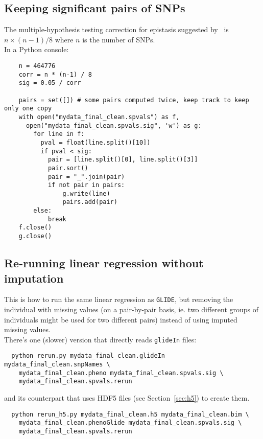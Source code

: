 \documentclass{article}
\newcommand{\glide}{\texttt{GLIDE}}
\begin{document}
\subsection{Keeping significant pairs of SNPs}
The multiple-hypothesis testing correction for epistasis suggested by~\cite{becker11} is $n \times (n-1)/8$ where $n$ is the number of SNPs. \\

In a Python console:\\
\begin{verbatim}
    n = 464776
    corr = n * (n-1) / 8 
    sig = 0.05 / corr

    pairs = set([]) # some pairs computed twice, keep track to keep only one copy
    with open("mydata_final_clean.spvals") as f, 
      open("mydata_final_clean.spvals.sig", 'w') as g:
        for line in f: 
          pval = float(line.split()[10]) 
          if pval < sig:
            pair = [line.split()[0], line.split()[3]]
            pair.sort()
            pair = "_".join(pair)
            if not pair in pairs:
                g.write(line)
                pairs.add(pair)
        else:
            break
    f.close()
    g.close()
\end{verbatim}


\subsection{Re-running linear regression without imputation}
\label{sec:rerun}
This is how to run the same linear regression as \glide, but removing the individual with missing values (on a pair-by-pair basis, ie. two different groups of individuals might be used for two different pairs) instead of using imputed missing values.\\ 

There's one (slower) version that directly reads \texttt{glideIn} files:\\

\begin{verbatim}
  python rerun.py mydata_final_clean.glideIn mydata_final_clean.snpNames \
    mydata_final_clean.pheno mydata_final_clean.spvals.sig \
    mydata_final_clean.spvals.rerun
\end{verbatim}

and its counterpart that uses HDF5 files (see Section~\ref{sec:h5}) to create them.\\

\begin{verbatim}
  python rerun_h5.py mydata_final_clean.h5 mydata_final_clean.bim \
    mydata_final_clean.phenoGlide mydata_final_clean.spvals.sig \
    mydata_final_clean.spvals.rerun
\end{verbatim}
\end{document}
